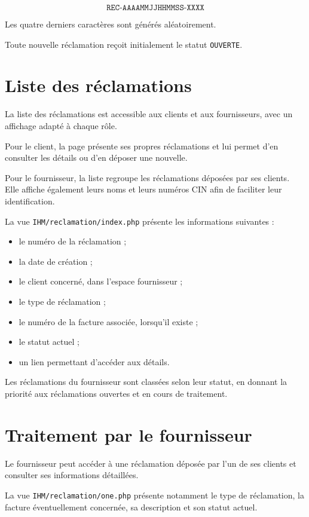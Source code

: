 \[
\texttt{REC-AAAAMMJJHHMMSS-XXXX}
\]

Les quatre derniers caractères sont générés aléatoirement.

Toute nouvelle réclamation reçoit initialement le statut \texttt{OUVERTE}.

\section{Liste des réclamations}

La liste des réclamations est accessible aux clients et aux fournisseurs, avec un affichage adapté à chaque rôle.

Pour le client, la page présente ses propres réclamations et lui permet d'en consulter les détails ou d'en déposer une nouvelle.

Pour le fournisseur, la liste regroupe les réclamations déposées par ses clients. Elle affiche également leurs noms et leurs numéros CIN afin de faciliter leur identification.

La vue \texttt{IHM/reclamation/index.php} présente les informations suivantes :
\begin{itemize}
    \item le numéro de la réclamation ;
    \item la date de création ;
    \item le client concerné, dans l'espace fournisseur ;
    \item le type de réclamation ;
    \item le numéro de la facture associée, lorsqu'il existe ;
    \item le statut actuel ;
    \item un lien permettant d'accéder aux détails.
\end{itemize}

Les réclamations du fournisseur sont classées selon leur statut, en donnant la priorité aux réclamations ouvertes et en cours de traitement.

\section{Traitement par le fournisseur}

Le fournisseur peut accéder à une réclamation déposée par l'un de ses clients et consulter ses informations détaillées.

La vue \texttt{IHM/reclamation/one.php} présente notamment le type de réclamation, la facture éventuellement concernée, sa description et son statut actuel.

